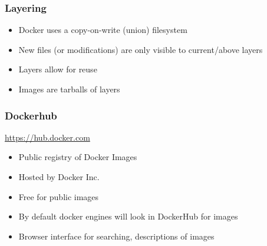 \documentclass[aspectratio=169,11pt,hyperref={colorlinks=true}]{beamer}
\begin{document}
\begin{frame}
    \frametitle{Layering}
    \begin{itemize}
        \item Docker uses a copy-on-write (union) filesystem
        \item New files (or modifications) are only visible to current/above layers
        \item Layers allow for reuse
        \item Images are tarballs of layers
    \end{itemize}
\end{frame}

\begin{frame}
    \frametitle{Dockerhub}
    \href{https:/hub.docker.com}{https://hub.docker.com}
    \begin{itemize}
        \item Public registry of Docker Images
        \item Hosted by Docker Inc.
        \item Free for public images
        \item By default docker engines will look in DockerHub for images
        \item Browser interface for searching, descriptions of images
    \end{itemize}
\end{frame}
\end{document}
